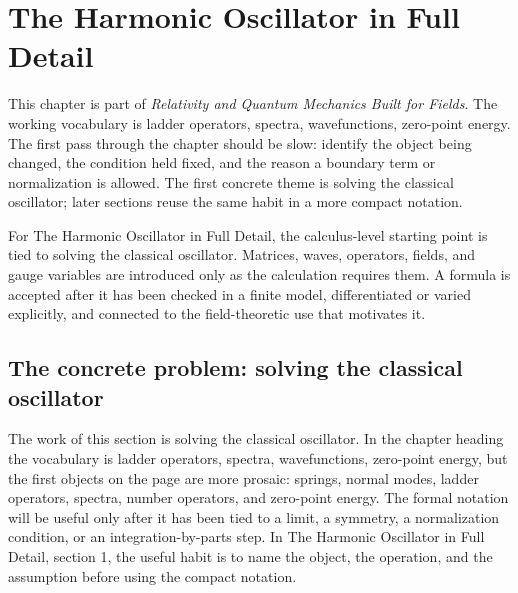 \chapter{The Harmonic Oscillator in Full Detail}


This chapter is part of \emph{Relativity and Quantum Mechanics Built for Fields}.  The working vocabulary is ladder operators, spectra, wavefunctions, zero-point energy.  The first pass through the chapter should be slow: identify the object being changed, the condition held fixed, and the reason a boundary term or normalization is allowed.  The first concrete theme is solving the classical oscillator; later sections reuse the same habit in a more compact notation.

For The Harmonic Oscillator in Full Detail, the calculus-level starting point is tied to solving the classical oscillator.  Matrices, waves, operators, fields, and gauge variables are introduced only as the calculation requires them.  A formula is accepted after it has been checked in a finite model, differentiated or varied explicitly, and connected to the field-theoretic use that motivates it.

\section{The concrete problem: solving the classical oscillator}













The work of this section is solving the classical oscillator.  In the chapter heading the vocabulary is ladder operators, spectra, wavefunctions, zero-point energy, but the first objects on the page are more prosaic: springs, normal modes, ladder operators, spectra, number operators, and zero-point energy.  The formal notation will be useful only after it has been tied to a limit, a symmetry, a normalization condition, or an integration-by-parts step.  In The Harmonic Oscillator in Full Detail, section 1, the useful habit is to name the object, the operation, and the assumption before using the compact notation.

